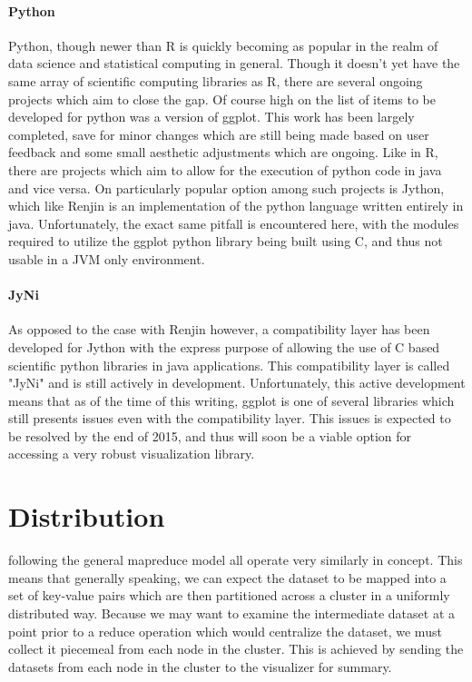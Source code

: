 \paragraph{Python}
Python, though newer than R is quickly becoming as popular in the realm of data science and statistical computing in general. Though it doesn't yet have the same array of scientific computing libraries as R, there are several ongoing projects which aim to close the gap. Of course high on the list of items to be developed for python was a version of ggplot. This work has been largely completed, save for minor changes which are still being made based on user feedback and some small aesthetic adjustments which are ongoing. Like in R, there are projects which aim to allow for the execution of python code in java and vice versa. On particularly popular option among such projects is Jython, which like Renjin is an implementation of the python language written entirely in java. Unfortunately, the exact same pitfall is encountered here, with the modules required to utilize the ggplot python library being built using C, and thus not usable in a JVM only environment. 

\paragraph{JyNi}
As opposed to the case with Renjin however, a compatibility layer has been developed for Jython with the express purpose of allowing the use of C based scientific python libraries in java applications. This compatibility layer is called "JyNi" \cite{Richthofer2013} and is still actively in development. Unfortunately, this active development means that as of the time of this writing, ggplot is one of several libraries which still presents issues even with the compatibility layer. This issues is expected to be resolved by the end of 2015, and thus will soon be a viable option for accessing a very robust visualization library.

\section{Distribution}
\label{sec:distribution}
 following the general mapreduce model all operate very similarly in concept. This means that generally speaking, we can expect the dataset to be mapped into a set of key-value pairs which are then partitioned across a cluster in a uniformly distributed way. Because we may want to examine the intermediate dataset at a point prior to a reduce operation which would centralize the dataset, we must collect it piecemeal from each node in the cluster. This is achieved by sending the datasets from each node in the cluster to the visualizer for summary. 

